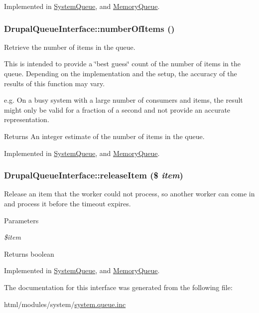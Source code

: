Implemented in \hyperlink{classSystemQueue_a28faefc0b81477b2dbfa1434236f3bb5}{SystemQueue}, and \hyperlink{classMemoryQueue_a055cd4bf4b319accf5ffa2c6f22685f1}{MemoryQueue}.\hypertarget{interfaceDrupalQueueInterface_aee5a22d355c9e6246690d0ed79fe306b}{
\subsubsection[{numberOfItems}]{\setlength{\rightskip}{0pt plus 5cm}DrupalQueueInterface::numberOfItems ()}}
\label{interfaceDrupalQueueInterface_aee5a22d355c9e6246690d0ed79fe306b}
Retrieve the number of items in the queue.

This is intended to provide a \char`\"{}best guess\char`\"{} count of the number of items in the queue. Depending on the implementation and the setup, the accuracy of the results of this function may vary.

e.g. On a busy system with a large number of consumers and items, the result might only be valid for a fraction of a second and not provide an accurate representation.

\begin{DoxyReturn}{Returns}
An integer estimate of the number of items in the queue. 
\end{DoxyReturn}


Implemented in \hyperlink{classSystemQueue_af5df5ad6fbfde21170f2e03115a7f7da}{SystemQueue}, and \hyperlink{classMemoryQueue_a266edfebcf6567707f3e2dafc3200491}{MemoryQueue}.\hypertarget{interfaceDrupalQueueInterface_a7f4ce9d592779327cd24dbf90566da67}{
\subsubsection[{releaseItem}]{\setlength{\rightskip}{0pt plus 5cm}DrupalQueueInterface::releaseItem (\$ {\em item})}}
\label{interfaceDrupalQueueInterface_a7f4ce9d592779327cd24dbf90566da67}
Release an item that the worker could not process, so another worker can come in and process it before the timeout expires.


\begin{DoxyParams}{Parameters}
\item[{\em \$item}]\end{DoxyParams}
\begin{DoxyReturn}{Returns}
boolean 
\end{DoxyReturn}


Implemented in \hyperlink{classSystemQueue_aac7e2e13e33ebba60d4594b3de6a22df}{SystemQueue}, and \hyperlink{classMemoryQueue_ad835863a58ca48f31f8cb1e3807b88cf}{MemoryQueue}.

The documentation for this interface was generated from the following file:\begin{DoxyCompactItemize}
\item 
html/modules/system/\hyperlink{system_8queue_8inc}{system.queue.inc}\end{DoxyCompactItemize}
